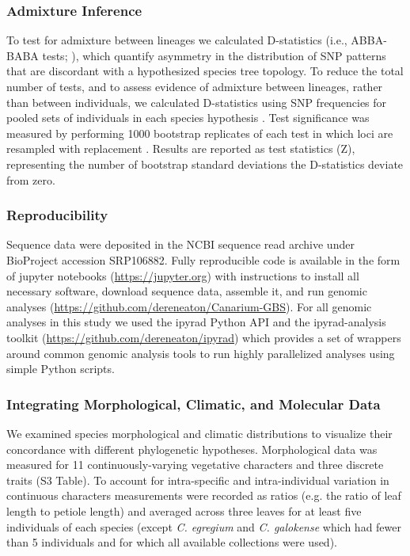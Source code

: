 \documentclass[10pt,letterpaper]{article}
\begin{document}
\subsubsection*{Admixture Inference}
To test for admixture between lineages we calculated D-statistics (i.e., ABBA-BABA tests; \cite{durand_testing_2011}), which quantify asymmetry in the distribution of SNP patterns that are discordant with a hypothesized species tree topology. To reduce the total number of tests, and to assess evidence of admixture between lineages, rather than between individuals, we calculated D-statistics using SNP frequencies for pooled sets of individuals in each species hypothesis \cite{durand_testing_2011}. Test significance was measured by performing 1000 bootstrap replicates of each test in which loci are resampled with replacement \cite{eaton_inferring_2013}. Results are reported as test statistics (Z), representing the number of bootstrap standard deviations the D-statistics deviate from zero. 

\subsubsection*{Reproducibility}
Sequence data were deposited in the NCBI sequence read archive under BioProject accession SRP106882. Fully reproducible code is available in the form of jupyter notebooks (\url{https://jupyter.org}) with instructions to install all necessary software, download sequence data, assemble it, and run genomic analyses (\url{https://github.com/dereneaton/Canarium-GBS}). For all genomic analyses in this study we used the ipyrad Python API and the ipyrad-analysis toolkit (\url{https://github.com/dereneaton/ipyrad}) which provides a set of wrappers around common genomic analysis tools to run highly parallelized analyses using simple Python scripts. 

\subsubsection*{Integrating Morphological, Climatic, and Molecular Data}
We examined species morphological and climatic distributions to visualize their concordance with different phylogenetic hypotheses. Morphological data was measured for 11 continuously-varying vegetative characters and three discrete traits (S3 Table). %
To account for intra-specific and intra-individual variation in continuous characters measurements were recorded as ratios (e.g. the ratio of leaf length to petiole length) and averaged across three leaves for at least five individuals of each species (except \emph{C. egregium} and \emph{C. galokense} which had fewer than 5 individuals and for which all available collections were used). 
\end{document}
